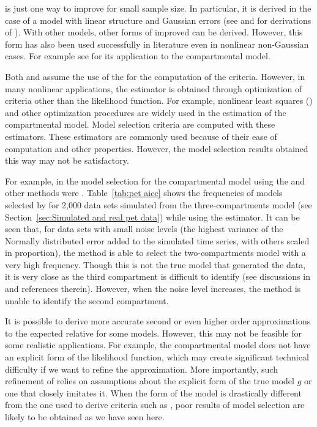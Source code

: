 \aicc is just one way to improve \aic for small sample size. In particular, it is derived in the case of a model with linear structure and Gaussian errors (see \cite{Hurvich:1989ev} and \cite[][sec.~6.4.1]{Burnham:2002wc} for derivations of \aicc). With other models, other forms of improved \aic can be derived. However, this form has also been used successfully in literature even in nonlinear non-Gaussian cases. For example see \cite{Turkheimer:2003iy} for its application to the \pet compartmental model.

Both \aic and \aicc assume the use of the \mle for the computation of the criteria. However, in many nonlinear applications, the estimator is obtained through optimization of criteria other than the likelihood function. For example, nonlinear least squares (\nls)  and other optimization procedures are widely used in the estimation of the \pet compartmental model. Model selection criteria are computed with these estimators. These estimators are commonly used because of their ease of computation and other properties. However, the model selection results obtained this way may not be satisfactory.

For example, in \cite{Zhou2013} the model selection for the \pet compartmental model using the \aic and other methods were . Table~\ref{tab:pet aicc} shows the frequencies of models selected by \aicc for 2,000 data sets simulated from the three-compartments model (see Section~\ref{sec:Simulated and real pet data}) while using the \nls estimator. It can be seen that, for data sets with small noise levels (the highest variance of the Normally distributed error added to the simulated time series, with others scaled in proportion), the \aicc method is able to select the two-compartments model with a very high frequency. Though this is not the true model that generated the data, it is very close as the third compartment is difficult to identify (see discussions in \cite{Zhou2013} and references therein). However, when the noise level increases, the method is unable to identify the second compartment.



It is possible to derive more accurate second or even higher order approximations to the expected relative \kld for some models. However, this may not be feasible for some realistic applications. For example, the \pet compartmental model does not have an explicit form of the likelihood function, which may create significant technical difficulty if we want to refine the \aic approximation. More importantly, such refinement of \aic relies on assumptions about the explicit form of the true model $g$ or one that closely imitates it. When the form of the model is drastically different from the one used to derive criteria such as \aicc, poor results of model selection are likely to be obtained as we have seen here.

